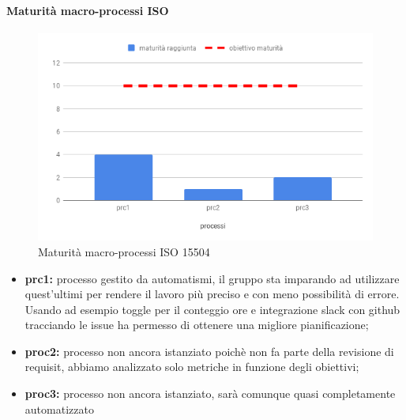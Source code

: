 \paragraph{Maturità macro-processi ISO }
\hspace{15cm}
\begin{figure}[h!]
	\centering
	\includegraphics[scale=0.5]{MaturitaProcessi.png}
	\caption{Maturità macro-processi ISO 15504}
\end{figure}
\begin{itemize}
	\item \textbf{prc1:} processo gestito da automatismi, il gruppo sta imparando ad utilizzare quest'ultimi per rendere il lavoro più preciso e con meno possibilità di errore. Usando ad esempio toggle per il conteggio ore e integrazione slack con github tracciando le issue ha
	permesso di ottenere una migliore pianificazione;
	\item \textbf{proc2:} processo non ancora istanziato poichè non fa parte della revisione di requisit, abbiamo analizzato solo metriche in funzione degli obiettivi;
	\item \textbf{proc3:} processo non ancora istanziato, sarà comunque quasi completamente automatizzato
\end{itemize}
\clearpage
